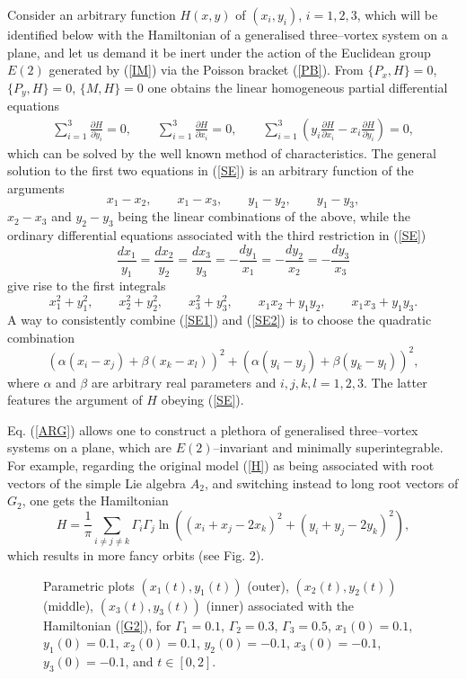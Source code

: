\documentclass[12pt]{article}
\def\be{\begin{equation}}
\def\ee{\end{equation}}
\def\bea{\begin{eqnarray}}
\def\eea{\end{eqnarray}}
\begin{document}
Consider an arbitrary function $H(x,y)$ of $(x_i,y_i)$, $i=1,2,3$, which will be identified below with the Hamiltonian of a generalised three--vortex system on a plane, and let us demand it be inert under the action of the Euclidean group $E(2)$ generated by (\ref{IM}) via the Poisson bracket (\ref{PB}). From $\{P_x,H \}=0$, $\{P_y,H \}=0$, $\{M,H\}=0$ one obtains the linear homogeneous partial differential equations
\bea\label{SE}
\sum_{i=1}^3 \frac{\partial H}{\partial y_i}=0, \qquad \sum_{i=1}^3 \frac{\partial H}{\partial x_i}=0, \qquad \sum_{i=1}^3 \left(y_i \frac{\partial H}{\partial x_i}- x_i \frac{\partial H}{\partial y_i} \right)=0,
\eea
which can be solved by the well known method of characteristics. The general solution to the first two equations in (\ref{SE}) is an arbitrary function of the arguments
\be\label{SE1}
x_1-x_2, \qquad x_1-x_3, \qquad y_1-y_2, \qquad y_1-y_3,
\ee
$x_2-x_3$ and $y_2-y_3$ being the linear combinations of the above,
while the ordinary differential equations associated with the third restriction in (\ref{SE})
\be
\frac{dx_1}{y_1}=\frac{dx_2}{y_2}=\frac{dx_3}{y_3}=-\frac{dy_1}{x_1}=-\frac{dy_2}{x_2}=-\frac{dy_3}{x_3}
\ee
give rise to the first integrals
\be\label{SE2}
x_1^2+y_1^2, \qquad x_2^2+y_2^2, \qquad x_3^2+y_3^2, \qquad x_1 x_2+y_1 y_2, \qquad x_1 x_3+y_1 y_3.
\ee
A way to consistently combine (\ref{SE1}) and (\ref{SE2}) is to choose the quadratic combination
\be\label{ARG}
{\left(\alpha (x_i-x_j)+\beta (x_k-x_l)\right)}^2 + {\left(\alpha (y_i-y_j)+\beta (y_k-y_l)\right)}^2,
\ee
where $\alpha$ and $\beta$ are arbitrary real parameters and $i,j,k,l=1,2,3$. The latter features the argument of $H$ obeying (\ref{SE}).

Eq. (\ref{ARG}) allows one to construct a plethora of generalised three--vortex systems on a plane, which are $E(2)$--invariant and minimally superintegrable. For example, regarding the original model (\ref{H}) as being associated with root vectors of the simple Lie algebra $A_2$, and switching instead to long root vectors of $G_2$, one gets the Hamiltonian
\be\label{G2}
H=\frac{1}{\pi} \sum_{i\ne j \ne k} \Gamma_i \Gamma_j \ln{\left({\left(x_i+x_j-2 x_k\right)}^2+{\left(y_i+y_j-2 y_k \right)}^2 \right)},
\ee
which results in more fancy orbits (see Fig. 2).



\begin{figure}[ht]
\begin{center}
\vskip-4mm
\caption{\small Parametric plots $(x_1 (t),y_1 (t))$ (outer), $(x_2 (t),y_2 (t))$ (middle), $(x_3 (t),y_3 (t))$ (inner) associated with the Hamiltonian (\ref{G2}), for $\Gamma_1=0.1$, $\Gamma_2=0.3$, $\Gamma_3=0.5$, $x_1(0)=0.1$, $y_1 (0)=0.1$, $x_2 (0)=0.1$, $y_2 (0)=-0.1$, $x_3 (0)=-0.1$, $y_3 (0)=-0.1$, and $t \in [0,2]$.}
\label{fig3}
\end{center}
\end{figure}
\end{document}
